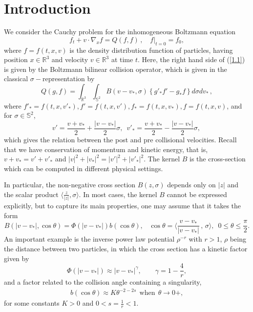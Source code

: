 \documentclass{amsart}[12pt, article]
\begin{document}
\tableofcontents

\section{Introduction}\label{s1}

We consider the Cauchy problem for the inhomogeneous Boltzmann equation
\begin{equation}\label{1.1}
f_t+v\cdot\nabla_x f=Q(f, f)\,,\,\,\,\,\,\,f|_{t=0}=f_0,
\end{equation}
where $f= f(t,x,v)$ is the density distribution function
of particles, having position
$x\in {{{\mathbb R}}}^3$ and velocity $v\in {{{\mathbb R}}}^3$ at time $t$.
Here, the right hand side of (\ref{1.1}) is given by the
Boltzmann bilinear collision operator, which is given in the classical $\sigma -$representation by
\[
Q(g, f)=\int_{{{{\mathbb R}}}^3}\int_{\mathbb S^{2}}B\left({v-v_*},\sigma
\right)
 \left\{g'_* f'-g_*f\right\}d\sigma dv_*\,,
\]
where $f'_*=f(t,x,v'_*), f'=f(t,x,v'), f_*=f(t,x,v_*), f=f(t,x,v)$, and for
$\sigma\in \mathbb S^{2}$,
$$
v'=\frac{v+v_*}{2}+\frac{|v-v_*|}{2}\sigma,\,\,\, v'_*
=\frac{v+v_*}{2}-\frac{|v-v_*|}{2}\sigma,\,
$$
which gives the relation between the post and pre collisional
velocities. Recall that  we have conservation of momentum and kinetic energy, that is, $v+v_\ast = v' +v'_\ast$ and $| v|^2+|v_\ast|^2 = | v'|^2 + | v'_\ast|^2$.
The kernel $B$ is the cross-section which can be computed in different physical
settings.

In particular,  the non-negative cross section
 $B(z, \sigma)$ depends only on $|z|$ and the scalar product
$\langle\frac{z}{|z|}, \sigma\rangle$. In most cases, the
kernel $B$ cannot be expressed explicitly, but
to capture its main properties, 
one may assume
that it takes  the form
\begin{equation*}
B(|v-v_*|, \cos \theta)=\Phi (|v-v_*|) b(\cos \theta),\,\,\,\,\,
\cos \theta=\Big\langle\frac{v-v_*}{|v-v_*|} \, ,\,\sigma\Big\rangle,\,\,\,
0\leq\theta\leq\frac{\pi}{2}.
\end{equation*}
An important example is 
the inverse power law potential $\rho^{-r}$ with $r>1$, $\rho$
being the distance between two  particles, in which the
cross section 
has a  kinetic factor 
given by
\begin{equation*}
\Phi(|v-v_*|)\approx |v-v_*|^{\gamma},\qquad \gamma=1-\frac{4}{r},
\end{equation*}
and a factor related to the collision angle containing a singularity,
\begin{equation*}
\begin{array}{l}
 b(\cos \theta)\approx K\theta^{-2-2s} \
\
 \mbox{when} \ \ \theta\rightarrow 0+,
\end{array}
\end{equation*}
for some constants $K>0$ and $0<s=\frac{1}{r}<1$.
\end{document}
